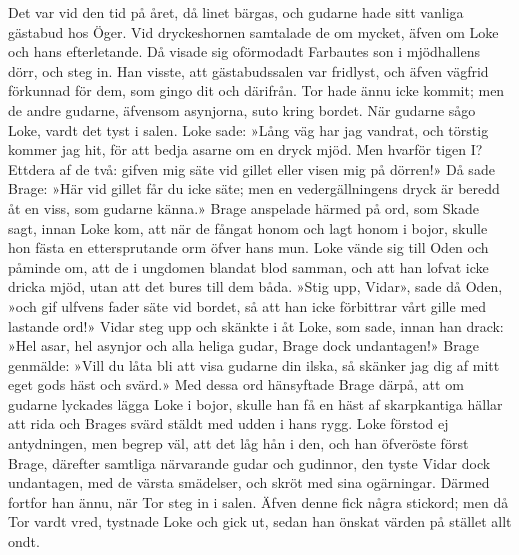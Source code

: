 Det var vid den tid på året, då linet bärgas, och gudarne hade sitt
vanliga gästabud hos Öger. Vid dryckeshornen samtalade de om mycket,
äfven om Loke och hans efterletande. Då visade sig oförmodadt Farbautes
son i mjödhallens dörr, och steg in. Han visste, att gästabudssalen var
fridlyst, och äfven vägfrid förkunnad för dem, som gingo dit och
därifrån. Tor hade ännu icke kommit; men de andre gudarne, äfvensom
asynjorna, suto kring bordet. När gudarne sågo Loke, vardt det tyst i
salen. Loke sade: »Lång väg har jag vandrat, och törstig kommer jag hit,
för att bedja asarne om en dryck mjöd. Men hvarför tigen I? Ettdera af
de två: gifven mig säte vid gillet eller visen mig på dörren!» Då sade
Brage: »Här vid gillet får du icke säte; men en vedergällningens dryck
är beredd åt en viss, som gudarne känna.» Brage anspelade härmed på ord,
som Skade sagt, innan Loke kom, att när de fångat honom och lagt honom i
bojor, skulle hon fästa en ettersprutande orm öfver hans mun. Loke vände
sig till Oden och påminde om, att de i ungdomen blandat blod samman, och
att han lofvat icke dricka mjöd, utan att det bures till dem båda. »Stig
upp, Vidar», sade då Oden, »och gif ulfvens fader säte vid bordet, så
att han icke förbittrar vårt gille med lastande ord!» Vidar steg upp och
skänkte i åt Loke, som sade, innan han drack: »Hel asar, hel asynjor och
alla heliga gudar, Brage dock undantagen!» Brage genmälde: »Vill du låta
bli att visa gudarne din ilska, så skänker jag dig af mitt eget gods
häst och svärd.» Med dessa ord hänsyftade Brage därpå, att om gudarne
lyckades lägga Loke i bojor, skulle han få en häst af skarpkantiga
hällar att rida och Brages svärd stäldt med udden i hans rygg. Loke
förstod ej antydningen, men begrep väl, att det låg hån i den, och han
öfveröste först Brage, därefter
samtliga\protect\hypertarget{lb1625905.xhtmlux5cux23start173}{}{}\protect\hypertarget{lb1625905.xhtmlux5cux23start173-a}{}{}\protect\hypertarget{lb1625905.xhtmlux5cux23start173-b}{}{}\protect\hypertarget{lb1625905.xhtmlux5cux23start173-c}{}{}\protect\hypertarget{lb1625905.xhtmlux5cux23start173-d}{}{}
närvarande gudar och gudinnor, den tyste Vidar dock undantagen, med de
värsta smädelser, och skröt med sina ogärningar. Därmed fortfor han
ännu, när Tor steg in i salen. Äfven denne fick några stickord; men då
Tor vardt vred, tystnade Loke och gick ut, sedan han önskat värden på
stället allt ondt.

